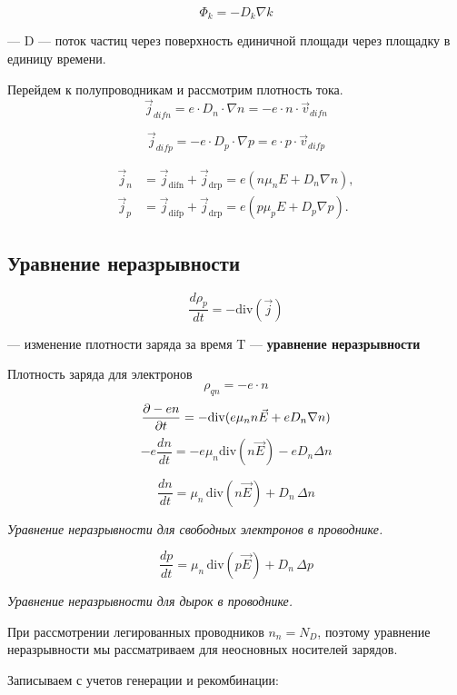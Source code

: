 \documentclass[../main.tex]{subfiles}
\begin{document}
\[\Phi_k = -D_k \nabla k\]
\begin{center}
    --- D --- поток частиц через поверхность единичной площади через площадку в единицу времени.    
\end{center}


Перейдем к полупроводникам и рассмотрим плотность тока.
\[\vec j_{difn} = e \cdot D_n \cdot \nabla n = -e \cdot n \cdot \vec v_{difn} \]

\[\vec j_{difp} = - e \cdot D_p \cdot \nabla p = e \cdot p \cdot \vec v_{difp}\]

\[
\boxed{
\begin{aligned}
\vec{j}_n &= \vec{j}_{\mathrm{difn}} + \vec{j}_{\mathrm{drp}} = e\!\left(n \mu_n E + D_n \nabla n\right),\\[6pt]
\vec{j}_p &= \vec{j}_{\mathrm{difp}} + \vec{j}_{\mathrm{drp}} = e\!\left(p \mu_p E + D_p \nabla p\right).
\end{aligned}
}
\]

\subsection{Уравнение неразрывности}
\[\frac{d \rho_p}{d t} = - \mathrm{div}( \vec j)\]
\begin{center}
    --- изменение плотности заряда за время T --- \textbf{уравнение неразрывности}
\end{center}

Плотность заряда для электронов
\[\rho_{qn} = - e \cdot n\]
\[\frac{\partial -en}{\partial t} = -\mathrm{div}(e \mu_n n \vec E + e D_n \nabla n)\]
\[-e \frac{d n}{d t} = -e \mu_n \mathrm{div}(n \vec E) - eD_n \Delta n\]

\[
\boxed{
\frac{d n}{d t} = \mu_n \, \mathrm{div}(n \vec{E}) + D_n \, \Delta n
}
\]
\begin{center}
\textit{Уравнение неразрывности для свободных электронов в проводнике.}
\end{center}

\[
\boxed{
\frac{d p}{d t} = \mu_n \, \mathrm{div}(p \vec{E}) + D_n \, \Delta p
}
\]
\begin{center}
\textit{Уравнение неразрывности для дырок в проводнике.}
\end{center}



При рассмотрении легированных проводников $n_n = N_D$, поэтому уравнение неразрывности мы рассматриваем для неосновных носителей зарядов.

Записываем с учетов генерации и рекомбинации:
\end{document}
